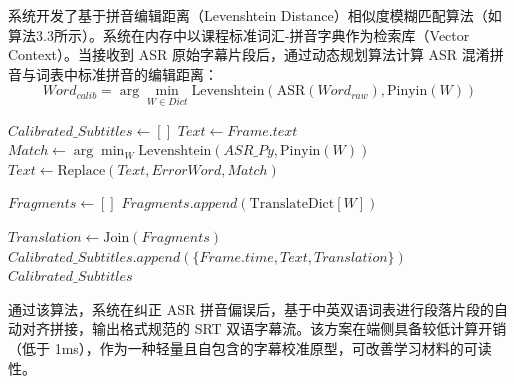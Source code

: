系统开发了基于拼音编辑距离（Levenshtein Distance）相似度模糊匹配算法（如算法3.3所示）。系统在内存中以课程标准词汇-拼音字典作为检索库（Vector Context）。当接收到 ASR 原始字幕片段后，通过动态规划算法计算 ASR 混淆拼音与词表中标准拼音的编辑距离：
\begin{equation}
Word_{calib} = \arg\min_{W \in Dict} \text{Levenshtein}(\text{ASR}(Word_{raw}), \text{Pinyin}(W))
\end{equation}

\begin{algorithm}
\caption{基于拼音编辑距离模糊匹配的 ASR 字幕校准算法}
\begin{algorithmic}[1]
    \State $Calibrated\_Subtitles \gets []$
        \State $Text \gets Frame.text$
            \State $Match \gets \arg\min_{W} \text{Levenshtein}(ASR\_Py, \text{Pinyin}(W))$
             
                \State $Text \gets \text{Replace}(Text, ErrorWord, Match)$
            \EndIf
        \EndFor
        
        \State $Fragments \gets []$
                \State $Fragments.append(\text{TranslateDict}[W])$
            \EndIf
        \EndFor
        
        \State $Translation \gets \text{Join}(Fragments)$
        \State $Calibrated\_Subtitles.append(\{Frame.time, Text, Translation\})$
    \EndFor
    \State \Return $Calibrated\_Subtitles$
\EndProcedure
\end{algorithmic}
\end{algorithm}

通过该算法，系统在纠正 ASR 拼音偏误后，基于中英双语词表进行段落片段的自动对齐拼接，输出格式规范的 SRT 双语字幕流。该方案在端侧具备较低计算开销（低于 1ms），作为一种轻量且自包含的字幕校准原型，可改善学习材料的可读性。
